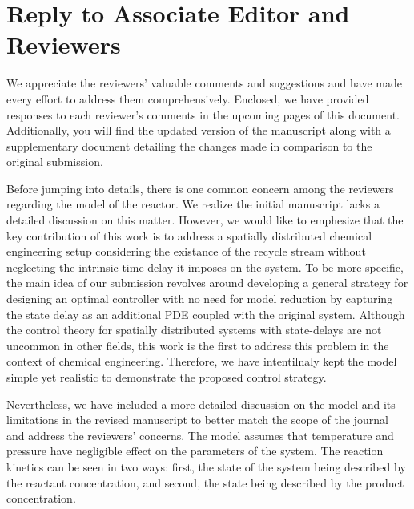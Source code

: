 \documentclass[10pt,answers]{exam}
\begin{document}
\section*{Reply to Associate Editor and Reviewers}

We appreciate the reviewers' valuable comments and suggestions and have made every effort to address them comprehensively. Enclosed, we have provided responses to each reviewer's comments in the upcoming pages of this document. Additionally, you will find the updated version of the manuscript along with a supplementary document detailing the changes made in comparison to the original submission.

Before jumping into details, there is one common concern among the reviewers regarding the model of the reactor. We realize the initial manuscript lacks a detailed discussion on this matter. 
However, we would like to emphesize that the key contribution of this work is to address a spatially distributed chemical engineering setup considering the existance of the recycle stream without neglecting the intrinsic time delay it imposes on the system. 
To be more specific, the main idea of our submission revolves around developing a general strategy for designing an optimal controller with no need for model reduction by capturing the state delay as an additional PDE coupled with the original system. 
Although the control theory for spatially distributed systems with state-delays are not uncommon in other fields, this work is the first to address this problem in the context of chemical engineering. Therefore, we have intentilnaly kept the model simple yet realistic to demonstrate the proposed control strategy.

Nevertheless, we have included a more detailed discussion on the model and its limitations in the revised manuscript to better match the scope of the journal and address the reviewers' concerns. The model assumes that temperature and pressure have negligible effect on the parameters of the system. The reaction kinetics can be seen in two ways: first, the state of the system being described by the reactant concentration, and second, the state being described by the product concentration.  
\end{document}
